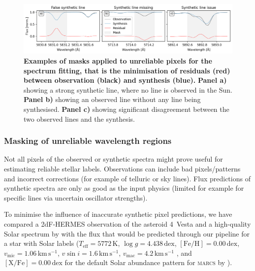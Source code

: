 \documentclass[
  journal=pasa,
  manuscript=research-paper, %
  year=2023,
  volume=37
]{cup-journal}
\newcommand{\marcs}{\textsc{marcs}\xspace}
\newcommand{\dex}{\,\mathrm{dex}}	%
\newcommand{\K}{\,\mathrm{K}}	%
\newcommand{\kms}{\,\mathrm{km\,s^{-1}}}	%
\begin{document}
\begin{figure}[ht]
\centering  
\includegraphics[width=\textwidth]{figures/example_masking_sun.png}
\caption{\textbf{Examples of masks applied to unreliable pixels for the spectrum fitting, that is the minimisation of residuals (red) between observation (black) and synthesis (blue).} \textbf{Panel a)} showing a strong synthetic line, where no line is observed in the Sun. \textbf{Panel b)} showing an observed line without any line being synthesised. \textbf{Panel c)} showing significant disagreement between the two observed lines and the synthesis.} \label{fig:example_masking_sun}
\end{figure}

\subsubsection{Masking of unreliable wavelength regions} \label{sec:masking_of_unreliable_wavelength_regions}

Not all pixels of the observed or synthetic spectra might prove useful for estimating reliable stellar labels. Observations can include bad pixels/patterns and incorrect corrections (for example of telluric or sky lines). Flux predictions of synthetic spectra are only as good as the input physics (limited for example for specific lines via uncertain oscillator strengths).

To minimise the influence of inaccurate synthetic pixel predictions, we have compared a 2dF-HERMES observation of the asteroid 4~Vesta and a high-quality  Solar spectrum by \citet{Hinkle2000} with the flux that would be predicted through our pipeline for a star with Solar labels ($T_\text{eff} = 5772\K$, $\log g = 4.438\dex$, $\mathrm{[Fe/H]} = 0.00\dex$, $v_\text{mic} = 1.06\kms$, $v \sin i = 1.6\kms$, $v_\text{mac} = 4.2\kms$ \citep{Prsa2016, Jofre2017}, and $\mathrm{[X/Fe]} = 0.00\dex$ for the default Solar abundance pattern for \marcs by \citet{Grevesse2007}).
\end{document}
